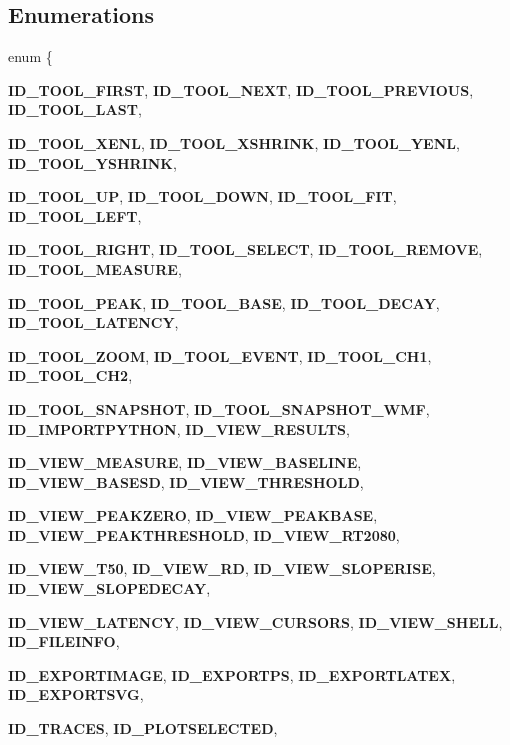 \subsection*{Enumerations}
\begin{DoxyCompactItemize}
\item 
enum \{ \par
{\bfseries ID\_\-TOOL\_\-FIRST}, 
{\bfseries ID\_\-TOOL\_\-NEXT}, 
{\bfseries ID\_\-TOOL\_\-PREVIOUS}, 
{\bfseries ID\_\-TOOL\_\-LAST}, 
\par
{\bfseries ID\_\-TOOL\_\-XENL}, 
{\bfseries ID\_\-TOOL\_\-XSHRINK}, 
{\bfseries ID\_\-TOOL\_\-YENL}, 
{\bfseries ID\_\-TOOL\_\-YSHRINK}, 
\par
{\bfseries ID\_\-TOOL\_\-UP}, 
{\bfseries ID\_\-TOOL\_\-DOWN}, 
{\bfseries ID\_\-TOOL\_\-FIT}, 
{\bfseries ID\_\-TOOL\_\-LEFT}, 
\par
{\bfseries ID\_\-TOOL\_\-RIGHT}, 
{\bfseries ID\_\-TOOL\_\-SELECT}, 
{\bfseries ID\_\-TOOL\_\-REMOVE}, 
{\bfseries ID\_\-TOOL\_\-MEASURE}, 
\par
{\bfseries ID\_\-TOOL\_\-PEAK}, 
{\bfseries ID\_\-TOOL\_\-BASE}, 
{\bfseries ID\_\-TOOL\_\-DECAY}, 
{\bfseries ID\_\-TOOL\_\-LATENCY}, 
\par
{\bfseries ID\_\-TOOL\_\-ZOOM}, 
{\bfseries ID\_\-TOOL\_\-EVENT}, 
{\bfseries ID\_\-TOOL\_\-CH1}, 
{\bfseries ID\_\-TOOL\_\-CH2}, 
\par
{\bfseries ID\_\-TOOL\_\-SNAPSHOT}, 
{\bfseries ID\_\-TOOL\_\-SNAPSHOT\_\-WMF}, 
{\bfseries ID\_\-IMPORTPYTHON}, 
{\bfseries ID\_\-VIEW\_\-RESULTS}, 
\par
{\bfseries ID\_\-VIEW\_\-MEASURE}, 
{\bfseries ID\_\-VIEW\_\-BASELINE}, 
{\bfseries ID\_\-VIEW\_\-BASESD}, 
{\bfseries ID\_\-VIEW\_\-THRESHOLD}, 
\par
{\bfseries ID\_\-VIEW\_\-PEAKZERO}, 
{\bfseries ID\_\-VIEW\_\-PEAKBASE}, 
{\bfseries ID\_\-VIEW\_\-PEAKTHRESHOLD}, 
{\bfseries ID\_\-VIEW\_\-RT2080}, 
\par
{\bfseries ID\_\-VIEW\_\-T50}, 
{\bfseries ID\_\-VIEW\_\-RD}, 
{\bfseries ID\_\-VIEW\_\-SLOPERISE}, 
{\bfseries ID\_\-VIEW\_\-SLOPEDECAY}, 
\par
{\bfseries ID\_\-VIEW\_\-LATENCY}, 
{\bfseries ID\_\-VIEW\_\-CURSORS}, 
{\bfseries ID\_\-VIEW\_\-SHELL}, 
{\bfseries ID\_\-FILEINFO}, 
\par
{\bfseries ID\_\-EXPORTIMAGE}, 
{\bfseries ID\_\-EXPORTPS}, 
{\bfseries ID\_\-EXPORTLATEX}, 
{\bfseries ID\_\-EXPORTSVG}, 
\par
{\bfseries ID\_\-TRACES}, 
{\bfseries ID\_\-PLOTSELECTED}, 

\end{DoxyCompactItemize}
